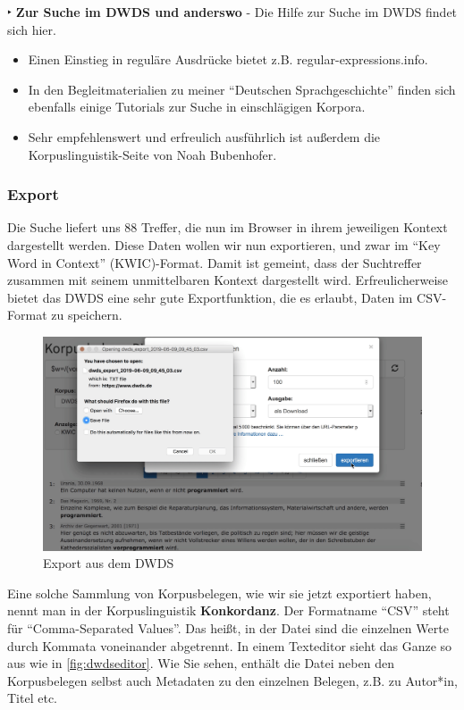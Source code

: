 \documentclass[]{article}
\begin{document}
 ‣ \textbf{Zur Suche im DWDS und anderswo} - Die Hilfe zur Suche im DWDS
findet sich hier.

\begin{itemize}
\item
  Einen Einstieg in reguläre Ausdrücke bietet z.B.
  regular-expressions.info.
\item
  In den Begleitmaterialien zu meiner ``Deutschen Sprachgeschichte''
  finden sich ebenfalls einige Tutorials zur Suche in einschlägigen
  Korpora.
\item
  Sehr empfehlenswert und erfreulich ausführlich ist außerdem die
  Korpuslinguistik-Seite von Noah Bubenhofer. 
\end{itemize}

\subsubsection{Export}\label{export}

Die Suche liefert uns 88 Treffer, die nun im Browser in ihrem jeweiligen
Kontext dargestellt werden. Diese Daten wollen wir nun exportieren, und
zwar im ``Key Word in Context'' (KWIC)-Format. Damit ist gemeint, dass
der Suchtreffer zusammen mit seinem unmittelbaren Kontext dargestellt
wird. Erfreulicherweise bietet das DWDS eine sehr gute Exportfunktion,
die es erlaubt, Daten im CSV-Format zu speichern.

\begin{figure}
\includegraphics[width=5.37in]{docs/fig/dwdsdownload} \caption{Export aus dem DWDS}\label{fig:dwdsexp}
\end{figure}

Eine solche Sammlung von Korpusbelegen, wie wir sie jetzt exportiert
haben, nennt man in der Korpuslinguistik \textbf{Konkordanz}. Der
Formatname ``CSV'' steht für ``Comma-Separated Values''. Das heißt, in
der Datei sind die einzelnen Werte durch Kommata voneinander abgetrennt.
In einem Texteditor sieht das Ganze so aus wie in \ref{fig:dwdseditor}.
Wie Sie sehen, enthält die Datei neben den Korpusbelegen selbst auch
Metadaten zu den einzelnen Belegen, z.B. zu Autor*in, Titel etc.
\end{document}
